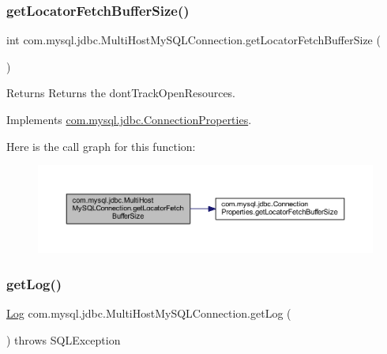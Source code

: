 \subsubsection{\texorpdfstring{get\+Locator\+Fetch\+Buffer\+Size()}{getLocatorFetchBufferSize()}}
{\footnotesize\ttfamily int com.\+mysql.\+jdbc.\+Multi\+Host\+My\+S\+Q\+L\+Connection.\+get\+Locator\+Fetch\+Buffer\+Size (\begin{DoxyParamCaption}{ }\end{DoxyParamCaption})}

\begin{DoxyReturn}{Returns}
Returns the dont\+Track\+Open\+Resources. 
\end{DoxyReturn}


Implements \mbox{\hyperlink{interfacecom_1_1mysql_1_1jdbc_1_1_connection_properties_a9e88b2b4823f85f1ce0a95b4a7b9b5d5}{com.\+mysql.\+jdbc.\+Connection\+Properties}}.

Here is the call graph for this function\+:
\nopagebreak
\begin{figure}[H]
\begin{center}
\leavevmode
\includegraphics[width=350pt]{classcom_1_1mysql_1_1jdbc_1_1_multi_host_my_s_q_l_connection_a681a0098d027412f890b819e9caa4e1d_cgraph}
\end{center}
\end{figure}
\mbox{\label{classcom_1_1mysql_1_1jdbc_1_1_multi_host_my_s_q_l_connection_aa844db76fbc95ba7a185cf4df1257800}} 
\subsubsection{\texorpdfstring{get\+Log()}{getLog()}}
{\footnotesize\ttfamily \mbox{\hyperlink{interfacecom_1_1mysql_1_1jdbc_1_1log_1_1_log}{Log}} com.\+mysql.\+jdbc.\+Multi\+Host\+My\+S\+Q\+L\+Connection.\+get\+Log (\begin{DoxyParamCaption}{ }\end{DoxyParamCaption}) throws S\+Q\+L\+Exception}

